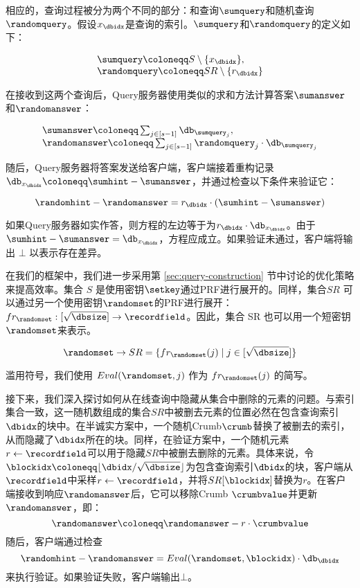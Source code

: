 相应的，查询过程被分为两个不同的部分：和查询$\sumquery$和随机查询$\randomquery$。假设$x_\dbidx$是查询的索引。$\sumquery$和$\randomquery$的定义如下：

$$
    \begin{array}{l}
        \sumquery \coloneqq  S \setminus \{x_\dbidx\}, \\
        \randomquery \coloneqq  SR \setminus \{r_\dbidx\}
    \end{array}
$$

在接收到这两个查询后，Query服务器使用类似的求和方法计算答案$\sumanswer$和$\randomanswer$：

$$
    \begin{array}{l}
        \sumanswer \coloneqq  \sum_{j \in [s-1]} \db_{\sumquery_j}, \\
        \randomanswer \coloneqq  \sum_{j \in [s-1]} \randomquery_j\cdot \db_{\sumquery_j}
    \end{array}
$$

随后，Query服务器将答案发送给客户端，客户端接着重构记录$\db_{x_\dbidx} \coloneqq \sumhint-\sumanswer$，并通过检查以下条件来验证它：

$$
    \randomhint-\randomanswer = r_\dbidx \cdot (\sumhint-\sumanswer)
$$

如果Query服务器如实作答，则方程的左边等于为$r_{\dbidx} \cdot \db_{x_\dbidx}$。由于$\sumhint - \sumanswer = \db_{x_\dbidx}$，方程应成立。如果验证未通过，客户端将输出 $\bot$ 以表示存在差异。

在我们的框架中，我们进一步采用第 \ref{sec:query-construction} 节中讨论的优化策略来提高效率。集合 $S$ 是使用密钥$\setkey$通过PRF进行展开的。同样，集合$SR$ 可以通过另一个使用密钥$\randomset$的PRF进行展开：$fr_{\randomset}: [\sqrt{\dbsize}] \to \recordfield$。因此，集合 SR 也可以用一个短密钥$\randomset$来表示。

$$
    \randomset \to SR = \{fr_{\randomset}(j) \mid j\in[\sqrt{\dbsize}]\}
$$

滥用符号，我们使用 $Eval(\randomset, j)$ 作为 $fr_{\randomset}(j)$ 的简写。

接下来，我们深入探讨如何从在线查询中隐藏从集合中删除的元素的问题。与索引集合一致，这一随机数组成的集合$SR$中被删去元素的位置必然在包含查询索引$\dbidx$的块中。在半诚实方案中，一个随机Crumb$\crumb$替换了被删去的索引，从而隐藏了$\dbidx$所在的块。同样，在验证方案中，一个随机元素$r \leftarrow \recordfield$可以用于隐藏$SR$中被删去删除的元素。具体来说，令$\blockidx \coloneqq \lfloor \dbidx /\sqrt{\dbsize} \rfloor$为包含查询索引$\dbidx$的块，客户端从$\recordfield$中采样$r \leftarrow \recordfield$，并将$SR[\blockidx]$替换为$r$。在客户端接收到响应$\randomanswer$后，它可以移除Crumb $\crumbvalue$并更新$\randomanswer$，即：
$$\randomanswer \coloneqq \randomanswer - r\cdot \crumbvalue$$
随后，客户端通过检查
$$\randomhint-\randomanswer = Eval(\randomset,\blockidx)\cdot \db_{\dbidx}$$
来执行验证。如果验证失败，客户端输出$\bot$。

